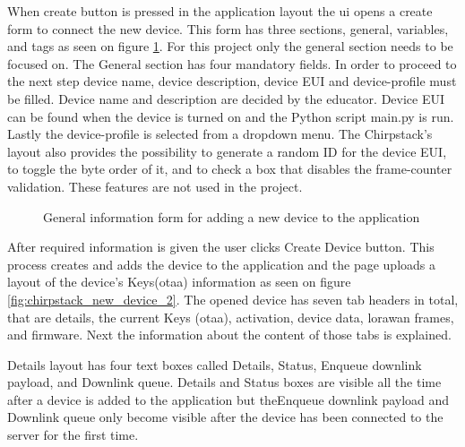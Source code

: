 When create button is pressed in the application layout the \gls{ui} opens a create form to connect the new device.
This form has three sections, general, variables, and tags as seen on figure \ref{fig:chirpstack_new_device}.
For this project only the general section needs to be focused on.
The General section has four mandatory fields.
In order to proceed to the next step device name, device description, device EUI and device-profile must be filled.
Device name and description are decided by the educator.
Device EUI can be found when the device is turned on and the Python script main.py is run.
Lastly the device-profile is selected from a dropdown menu.
The Chirpstack's layout also provides the possibility to generate a random ID for the device EUI, to toggle the byte order of it, and to check a box that disables the frame-counter validation.
These features are not used in the project.

\begin{figure}[ht]
  \centering
  \caption{General information form for adding a new device to the application}
  \label{fig:chirpstack_new_device}
\end{figure}

After required information is given the user clicks Create Device button.
This process creates and adds the device to the application and the page uploads a layout of the device's Keys(\gls{otaa}) information as seen on figure \ref{fig:chirpstack_new_device_2}. 
The opened device has seven tab headers in total, that are details, the current Keys (\gls{otaa}), activation, device data, \gls{lorawan} frames, and firmware.
Next the information about the content of those tabs is explained.

Details layout has four text boxes called Details, Status, Enqueue downlink payload, and Downlink queue.
Details and Status boxes are visible all the time after a device is added to the application but theEnqueue downlink payload and Downlink queue only become visible after the device has been connected to the server for the first time.


